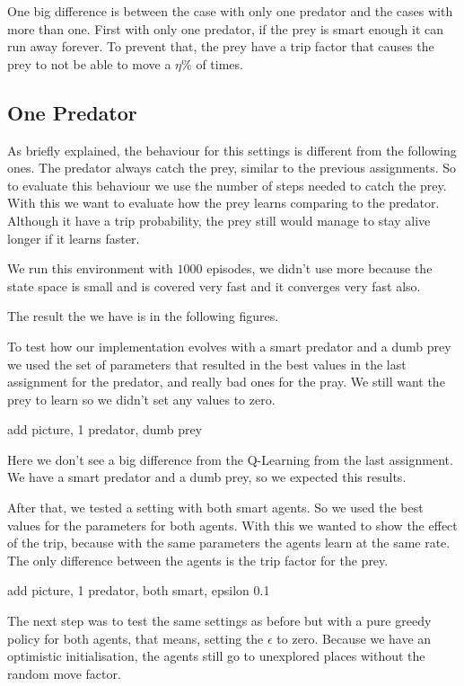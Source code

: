 \documentclass{article}
\begin{document}
One big difference is between the case with only one predator and the cases with
more than one. First with only one predator, if the prey is smart enough it can
run away forever. To prevent that, the prey have a trip factor that causes the
prey to not be able to move a $\eta\%$ of times.

\subsection{One Predator}
As briefly explained, the behaviour for this settings is different from the
following ones. The predator always catch the prey, similar to the previous
assignments. So to evaluate this behaviour we use the number of steps needed to
catch the prey. With this we want to evaluate how the prey learns comparing to
the predator. Although it have a trip probability, the prey still would manage to
stay alive longer if it learns faster.

We run this environment with $1000$ episodes, we didn't use more because the
state space is small and is covered very fast and it converges very fast also.

The result the we have is in the following figures.

To test how our implementation evolves with a smart predator and a dumb prey we
used the set of parameters that resulted in the best values in the last
assignment for the predator, and really bad ones for the pray. We still want the
prey to learn so we didn't set any values to zero.

\error add picture, 1 predator, dumb prey

Here we don't see a big difference from the Q-Learning from the last assignment.
We have a smart predator and a dumb prey, so we expected this results.


After that, we tested a setting with both smart agents. So we used the best
values for the parameters for both agents. With this we wanted to show the effect
of the trip, because with the same parameters the agents learn at the same rate.
The only difference between the agents is the trip factor for the prey.

\error add picture, 1 predator, both smart, epsilon 0.1
\label{fig2}

The next step was to test the same settings as before but with a pure greedy
policy for both agents, that means, setting the $\epsilon$ to zero. Because we
have an optimistic initialisation, the agents still go to unexplored places
without the random move factor.
\end{document}
